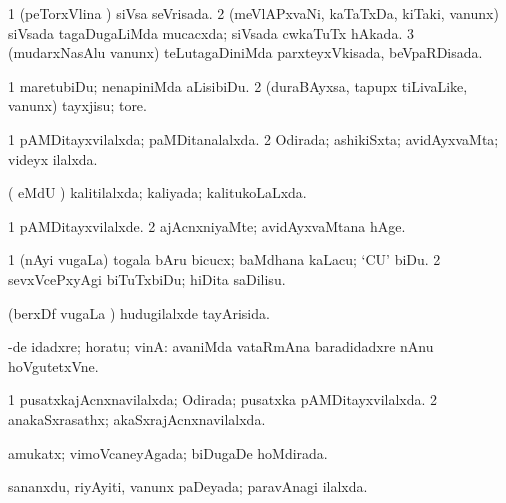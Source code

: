 \bentry 
{} 
\gl{\gu}
\expl{}
\bmng
\bnum
\num{1} (peTorxVlina \vi) siVsa seVrisada. 
\num{2} (meVlAPxvaNi, kaTaTxDa, kiTaki, \mo vanunx) siVsada tagaDugaLiMda mucacxda; siVsada cwkaTuTx hAkada. 
\num{3} (mudarxNasAlu \mo vanunx) teLutagaDiniMda parxteyxVkisada, beVpaRDisada. 
\enum
\emng
\eentry

\bentry
{} 
\gl{\sakirx}
\bmng
\bnum
\num{1} maretubiDu; nenapiniMda aLisibiDu. 
\num{2} (duraBAyxsa, tapupx tiLivaLike, \mo vanunx) tayxjisu; tore. 
\enum
\emng
\eentry

\bentry
{} 
\gl{\gu}
\expl{}
\bmng
\bnum
\num{1} pAMDitayxvilalxda; paMDitanalalxda. 
\num{2} Odirada; ashikiSxta; avidAyxvaMta; videyx ilalxda. 
\enum
\emng
\eentry

\bentry
{} 
\gl{\gu}
\expl{}
\bmng
( eMdU \parx) kalitilalxda; kaliyada; kalitukoLaLxda. 
\emng
\eentry

\bentry
{} 
\gl{\kirxvi}
\expl{}
\bmng
\bnum
\num{1} pAMDitayxvilalxde. 
\num{2} ajAcnxniyaMte; avidAyxvaMtana hAge. 
\enum
\emng
\eentry

\bentry
{} 
\gl{\sakirx}
\expl{}
\bmng
\bnum
\num{1} (nAyi \mo vugaLa) togala bAru bicucx; baMdhana kaLacu; `CU' biDu. 
\num{2} sevxVcePxyAgi biTuTxbiDu; hiDita saDilisu. 
\enum
\emng
\eentry

\bentry
{} 
\gl{\gu}
\expl{}
\bmng
(berxDf \mo vugaLa \vi) hudugilalxde tayArisida. 
\emng
\eentry

\bentry
{} 
\gl{\saMavayx}
\expl{}
\bmng
-de idadxre; horatu; vinA:  avaniMda vataRmAna baradidadxre nAnu hoVgutetxVne. 
\emng
\eentry

\bentry
{} 
\gl{\gu}
\expl{}
\bmng
\bnum
\num{1} pusatxkajAcnxnavilalxda; Odirada; pusatxka pAMDitayxvilalxda. 
\num{2} anakaSxrasathx; akaSxrajAcnxnavilalxda. 
\enum
\emng
\eentry

\bentry
{} 
\gl{\gu}
\expl{}
\bmng
amukatx; vimoVcaneyAgada; biDugaDe hoMdirada. 
\emng
\eentry

\bentry
{} 
\gl{\gu}
\expl{}
\bmng
sananxdu, riyAyiti, \mo vanunx paDeyada; paravAnagi ilalxda. 
\emng
\eentry

